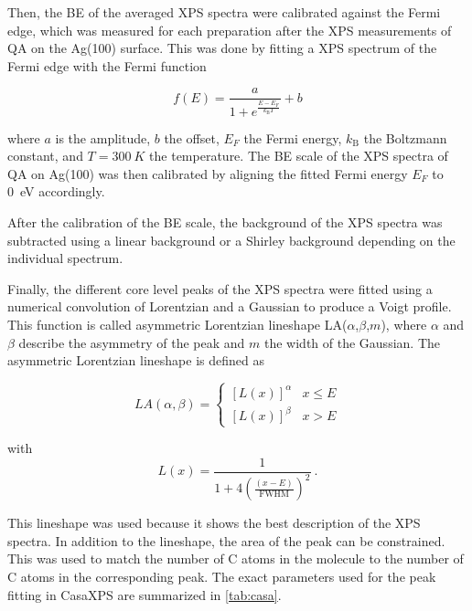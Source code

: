 Then, the \ac{BE} of the averaged \ac{XPS} spectra were calibrated against the Fermi edge, which was measured for each preparation after the \ac{XPS} measurements of \ac{QA} on the Ag(100) surface. This was done by fitting a \ac{XPS} spectrum of the Fermi edge with the Fermi function

\begin{equation}
	f(E) = \frac{a}{1 + e^{\frac{E - E_F}{k_\mathrm{B}T}}} + b
	\label{eq:fermi}
\end{equation}

where $a$ is the amplitude, $b$ the offset, $E_F$ the Fermi energy, $k_\mathrm{B}$ the Boltzmann constant, and $T=300~\si{K}$ the temperature. The \ac{BE} scale of the \ac{XPS} spectra of \ac{QA} on Ag(100) was then calibrated by aligning the fitted Fermi energy $E_F$ to 0~\si{\eV} accordingly.

After the calibration of the \ac{BE} scale, the background of the \ac{XPS} spectra was subtracted using a linear background or a Shirley background\autocite{Shirley1972} depending on the individual spectrum. 

Finally, the different core level peaks of the \ac{XPS} spectra were fitted using a numerical convolution of Lorentzian and a Gaussian to produce a Voigt profile. This function is called asymmetric Lorentzian lineshape LA($\alpha$,$\beta$,$m$), where $\alpha$ and $\beta$ describe the asymmetry of the peak and $m$ the width of the Gaussian.\autocite{CasaSoftwareLtd2022} The asymmetric Lorentzian lineshape is defined as

\begin{equation}
	LA(\alpha,\beta) = \begin{cases}
		\left[L(x) \right]^\alpha & x \leq E \\
		\left[L(x) \right]^\beta & x > E
	\end{cases}
\end{equation}

with 
\begin{equation}
	L(x) = \frac{1}{1 + 4 \left( \frac{(x - E)}{\text{FWHM}} \right)^2} ~.
\end{equation}

This lineshape was used because it shows the best description of the \ac{XPS} spectra. In addition to the lineshape, the area of the peak can be constrained. This was used to match the number of C atoms in the molecule to the number of C atoms in the corresponding peak. The exact parameters used for the peak fitting in CasaXPS are summarized in \autoref{tab:casa}.

